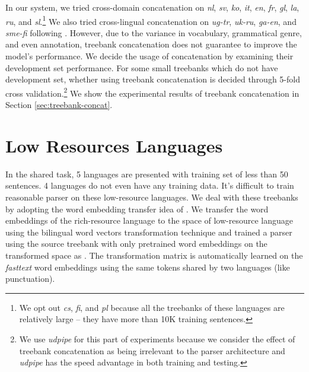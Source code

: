 \documentclass[11pt,a4paper]{article}
\begin{document}
In our system, we tried cross-domain concatenation on
\textit{nl}, \textit{sv}, \textit{ko}, \textit{it}, \textit{en}, \textit{fr},
\textit{gl}, \textit{la}, \textit{ru}, and \textit{sl}.\footnote{We opt out \textit{cs}, \textit{fi}, and \textit{pl} because all the treebanks of these languages are relatively large -- they have more than 10K training sentences.}
We also tried cross-lingual concatenation on \textit{ug-tr}, \textit{uk-ru}, \textit{ga-en},
and \textit{sme-fi} following \citet{che-EtAl:2017:K17-3}.
However, due to the variance in vocabulary, grammatical genre, and even annotation, 
treebank concatenation does not guarantee to improve the model's performance.
We decide the usage of concatenation by examining their development set performance.
For some small treebanks which do not have development set, whether using treebank concatenation
is decided through 5-fold cross validation.\footnote{We use \textit{udpipe}
	for this part of experiments
	because we consider the effect of treebank concatenation as
	being irrelevant to the parser architecture
	and \textit{udpipe} has the speed advantage in both training and testing.}
We show the experimental results of treebank concatenation
in Section \ref{sec:treebank-concat}.






\section{Low Resources Languages}\label{sec:low}

In the shared task, 5 languages are presented with training set of less than 50 sentences.
4 languages do not even have any training data.
It's difficult to train reasonable parser on these low-resource languages.
We deal with these treebanks by adopting the word embedding transfer idea 
of \citet{guo-EtAl:2015:ACL-IJCNLP2}.
We transfer the word embeddings of the rich-resource language
to the space of low-resource language using the bilingual word vectors transformation technique
\cite{DBLP:journals/corr/SmithTHH17}
and trained a parser using the source treebank
with only pretrained word embeddings on the transformed space
as .
The transformation matrix is automatically learned on the \textit{fasttext} word embeddings
using the same tokens shared by two languages (like punctuation).
\end{document}
